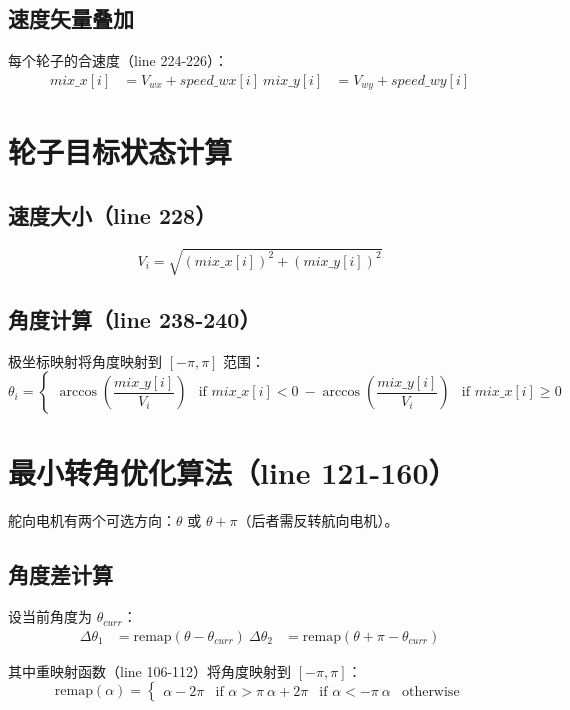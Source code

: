 \documentclass[12pt,a4paper]{article}
\begin{document}
\subsection{速度矢量叠加}
每个轮子的合速度（line 224-226）：
\begin{align}
mix\_x[i] &= V_{wx} + speed\_wx[i] \
mix\_y[i] &= V_{wy} + speed\_wy[i]
\end{align}

\section{轮子目标状态计算}

\subsection{速度大小（line 228）}
\begin{equation}
V_i = \sqrt{(mix\_x[i])^2 + (mix\_y[i])^2}
\end{equation}

\subsection{角度计算（line 238-240）}
极坐标映射将角度映射到 $[-\pi, \pi]$ 范围：
\begin{equation}
\theta_i = \begin{cases}
\arccos\left(\dfrac{mix\_y[i]}{V_i}\right) & \text{if } mix\_x[i] < 0 \
-\arccos\left(\dfrac{mix\_y[i]}{V_i}\right) & \text{if } mix\_x[i] \geq 0
\end{cases}
\end{equation}

\section{最小转角优化算法（line 121-160）}

舵向电机有两个可选方向：$\theta$ 或 $\theta + \pi$（后者需反转航向电机）。

\subsection{角度差计算}
设当前角度为 $\theta_{curr}$：
\begin{align}
\Delta\theta_1 &= \text{remap}(\theta - \theta_{curr}) \
\Delta\theta_2 &= \text{remap}(\theta + \pi - \theta_{curr})
\end{align}

其中重映射函数（line 106-112）将角度映射到 $[-\pi, \pi]$：
\begin{equation}
\text{remap}(\alpha) = \begin{cases}
\alpha - 2\pi & \text{if } \alpha > \pi \
\alpha + 2\pi & \text{if } \alpha < -\pi \
\alpha & \text{otherwise}
\end{cases}
\end{equation}
\end{document}
